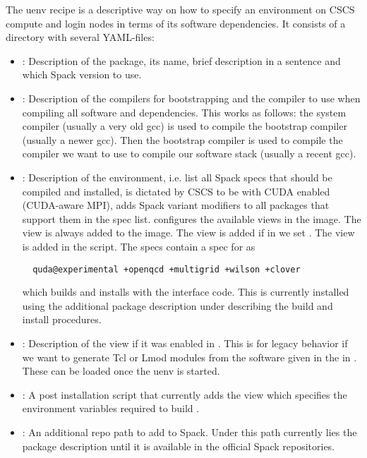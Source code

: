 The uenv recipe is a descriptive way on how to specify an environment on CSCS compute and login nodes in terms of its software dependencies.
It consists of a directory with several YAML-files:
\begin{itemize}
  \item {}: Description of the package, its name, brief description in a sentence and which Spack version to use.
  \item {}: Description of the compilers for bootstrapping and the compiler to use when compiling all software and dependencies. This works as follows: the system compiler (usually a very old gcc) is used to compile the bootstrap compiler (usually a newer gcc). Then the bootstrap compiler is used to compile the compiler we want to use to compile our software stack (usually a recent gcc).
  \item{: Description of the environment, i.e.  list all Spack specs that should be compiled and installed,  is dictated by CSCS to be  with CUDA enabled (CUDA-aware MPI),  adds Spack variant modifiers to all packages that support them in the spec list.  configures the available views in the image. The view  is always added to the image. The view  is added if in  we set . The  view is added in the  script. The specs contain a spec for \quda as
  \begin{verbatim}
  quda@experimental +openqcd +multigrid +wilson +clover
  \end{verbatim}
  which builds and installs \quda with the interface code. This is currently installed using the additional package description under  describing the \quda build and install procedures. }
  \item {}: Description of the  view if it was enabled in . This is for legacy behavior if we want to generate Tcl\cite{online:tcl} or Lmod\cite{github:lmod} modules from the software given in the  in . These can be loaded once the uenv is started.
  \item {}: A post installation script that currently adds the  view which specifies the environment variables required to build \openqxd.
  \item {}: An additional repo path to add to Spack. Under this path currently lies the \quda package description until it is available in the official Spack repositories.
\end{itemize}

